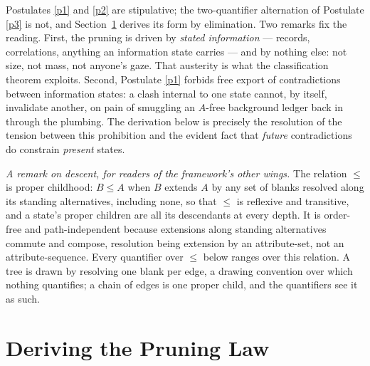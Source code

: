 Postulates \ref{p1} and \ref{p2} are stipulative; the two-quantifier alternation of Postulate \ref{p3} is not, and Section~\ref{sec:derivation} derives its form by elimination. Two remarks fix the reading. First, the pruning is driven by \emph{stated information} --- records, correlations, anything an information state carries --- and by nothing else: not size, not mass, not anyone's gaze. That austerity is what the classification theorem exploits. Second, Postulate \ref{p1} forbids free export of contradictions between information states: a clash internal to one state cannot, by itself, invalidate another, on pain of smuggling an $A$-free background ledger back in through the plumbing. The derivation below is precisely the resolution of the tension between this prohibition and the evident fact that \emph{future} contradictions do constrain \emph{present} states.

\emph{A remark on descent, for readers of the framework's other wings.} The relation $\le$ is proper childhood: $B \le A$ when $B$ extends $A$ by any set of blanks resolved along its standing alternatives, including none, so that $\le$ is reflexive and transitive, and a state's proper children are all its descendants at every depth. It is order-free and path-independent because extensions along standing alternatives commute and compose, resolution being extension by an attribute-set, not an attribute-sequence. Every quantifier over $\le$ below ranges over this relation. A tree is drawn by resolving one blank per edge, a drawing convention over which nothing quantifies; a chain of edges is one proper child, and the quantifiers see it as such.

\section{Deriving the Pruning Law}\label{sec:derivation}



